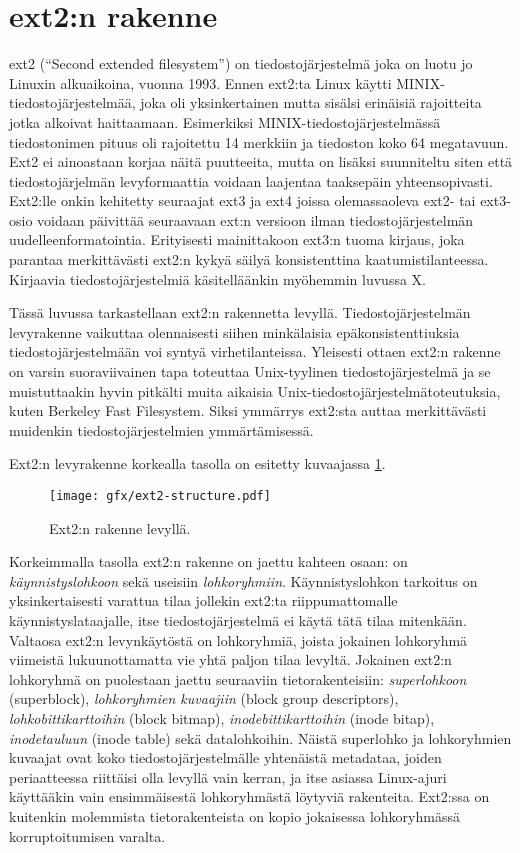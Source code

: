\section{ext2:n rakenne}
ext2 (``Second extended filesystem'')  on tiedostojärjestelmä joka on luotu jo Linuxin alkuaikoina, vuonna 1993.
Ennen ext2:ta Linux käytti MINIX-tiedostojärjestelmää,
joka oli yksinkertainen mutta sisälsi erinäisiä rajoitteita jotka alkoivat haittaamaan.
Esimerkiksi MINIX-tiedostojärjestelmässä tiedostonimen pituus oli rajoitettu 14 merkkiin
ja tiedoston koko 64 megatavuun.
Ext2 ei ainoastaan korjaa näitä puutteeita,
mutta on lisäksi suunniteltu siten että tiedostojärjelmän levyformaattia voidaan laajentaa taaksepäin yhteensopivasti.
Ext2:lle onkin kehitetty seuraajat ext3 ja ext4 joissa olemassaoleva ext2- tai ext3-osio voidaan päivittää seuraavaan
ext:n versioon ilman tiedostojärjestelmän uudelleenformatointia.
Erityisesti mainittakoon ext3:n tuoma kirjaus, joka parantaa merkittävästi ext2:n kykyä säilyä konsistenttina kaatumistilanteessa.
Kirjaavia tiedostojärjestelmiä käsitelläänkin myöhemmin luvussa X.

Tässä luvussa tarkastellaan ext2:n rakennetta levyllä.
Tiedostojärjestelmän levyrakenne vaikuttaa olennaisesti siihen minkälaisia epäkonsistenttiuksia tiedostojärjestelmään voi syntyä virhetilanteissa.
Yleisesti ottaen ext2:n rakenne on varsin suoraviivainen tapa toteuttaa Unix-tyylinen tiedostojärjestelmä ja se muistuttaakin hyvin pitkälti muita aikaisia Unix-tiedostojärjestelmätoteutuksia, kuten Berkeley Fast Filesystem.
Siksi ymmärrys ext2:sta auttaa merkittävästi muidenkin tiedostojärjestelmien ymmärtämisessä.

Ext2:n levyrakenne korkealla tasolla on esitetty kuvaajassa \ref{ext2_disk_format}.

\begin{figure}
    \label{ext2_disk_format}
    \centering
    \texttt{[image: gfx/ext2-structure.pdf]}
    \caption{Ext2:n rakenne levyllä.}
\end{figure}

Korkeimmalla tasolla ext2:n rakenne on jaettu kahteen osaan: on \emph{käynnistyslohkoon} sekä useisiin \emph{lohkoryhmiin}.
Käynnistyslohkon tarkoitus on yksinkertaisesti varattua tilaa jollekin ext2:ta riippumattomalle käynnistyslataajalle,
itse tiedostojärjestelmä ei käytä tätä tilaa mitenkään.
Valtaosa ext2:n levynkäytöstä on lohkoryhmiä,
joista jokainen lohkoryhmä viimeistä lukuunottamatta vie yhtä paljon tilaa levyltä.
Jokainen ext2:n lohkoryhmä on puolestaan jaettu seuraaviin tietorakenteisiin:
\emph{superlohkoon} (superblock), 
\emph{lohkoryhmien kuvaajiin} (block group descriptors),
\emph{lohkobittikarttoihin} (block bitmap),
\emph{inodebittikarttoihin} (inode bitap),
\emph{inodetauluun} (inode table) sekä datalohkoihin.
Näistä superlohko ja lohkoryhmien kuvaajat ovat koko tiedostojärjestelmälle yhtenäistä metadataa,
joiden periaatteessa riittäisi olla levyllä vain kerran,
ja itse asiassa Linux-ajuri käyttääkin vain ensimmäisestä lohkoryhmästä löytyviä rakenteita.
Ext2:ssa on kuitenkin molemmista tietorakenteista on kopio jokaisessa lohkoryhmässä korruptoitumisen varalta.

